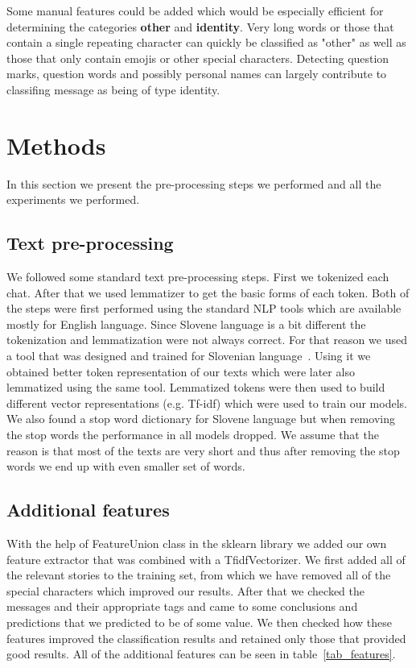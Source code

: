 \documentclass[11pt,a4paper]{article}
\begin{document}
Some manual features could be added which would be especially efficient for determining the categories \textbf{other} and \textbf{identity}.
Very long words or those that contain a single repeating character can quickly be classified as "other" as well as those that only contain emojis or other special characters.
Detecting question marks, question words and possibly personal names can largely contribute to classifing message as being of type identity.

\section{Methods}
In this section we present the pre-processing steps we performed and all the experiments we performed.

\subsection{Text pre-processing}
We followed some standard text pre-processing steps.
First we tokenized each chat.
After that we used lemmatizer to get the basic forms of each token.
Both of the steps were first performed using the standard NLP tools which are available mostly for English language.
Since Slovene language is a bit different the tokenization and lemmatization were not always correct.
For that reason we used a tool that was designed and trained for Slovenian language~\cite{slotokenizer}.
Using it we obtained better token representation of our texts which were later also lemmatized using the same tool.
Lemmatized tokens were then used to build different vector representations (e.g. Tf-idf) which were used to train our models.
We also found a stop word dictionary for Slovene language but when removing the stop words the performance in all models dropped.
We assume that the reason is that most of the texts are very short and thus after removing the stop words we end up with even smaller set of words.

\subsection{Additional features}

With the help of FeatureUnion class in the sklearn library we added our own feature extractor that was combined with a TfidfVectorizer.
We first added all of the relevant stories to the training set, from which we have removed all of the special characters which improved our results.
After that we checked the messages and their appropriate tags and came to some conclusions and predictions that we predicted to be of some value.
We then checked how these features improved the classification results and retained only those that provided good results.
All of the additional features can be seen in table~\ref{tab_features}.
\end{document}
